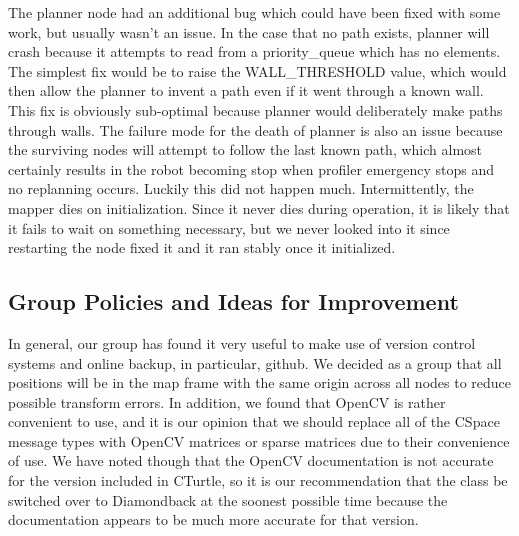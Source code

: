\documentclass{article}
\begin{document}
The planner node had an additional bug which could have been fixed with some work, but usually wasn't an issue.  
In the case that no path exists, planner will crash because it attempts to read from a priority_queue which has no elements.
The simplest fix would be to raise the WALL_THRESHOLD value, which would then allow the planner to invent a path even if it went through a known wall.  
This fix is obviously sub-optimal because planner would deliberately make paths through walls.
The failure mode for the death of planner is also an issue because the surviving nodes will attempt to follow the last known path, which almost certainly results in the robot becoming stop when profiler emergency stops and no replanning occurs.  Luckily this did not happen much.
Intermittently, the mapper dies on initialization.  Since it never dies during operation, it is likely that it fails to wait on something necessary, but we never looked into it since restarting the node fixed it and it ran stably once it initialized.

\subsection{Group Policies and Ideas for Improvement}

In general, our group has found it very useful to make use of version control systems and online backup, in particular, github.
We decided as a group that all positions will be in the map frame with the same origin across all nodes to reduce possible transform errors.
In addition, we found that OpenCV is rather convenient to use, and it is our opinion that we should replace all of the CSpace message types with OpenCV matrices or sparse matrices due to their convenience of use.
We have noted though that the OpenCV documentation is not accurate for the version included in CTurtle, so it is our recommendation that the class be switched over to Diamondback at the soonest possible time because the documentation appears to be much more accurate for that version.
\end{document}
